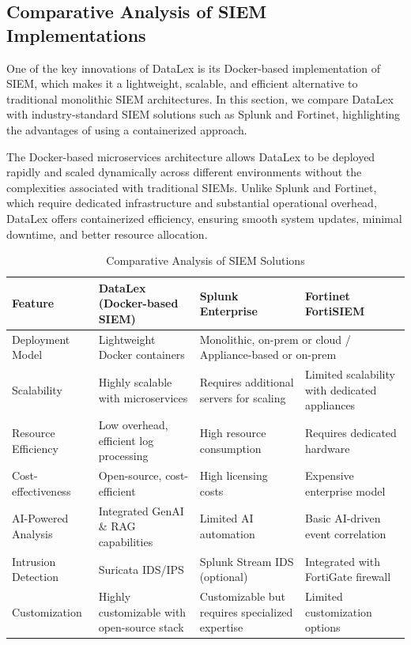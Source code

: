\subsection{Comparative Analysis of SIEM Implementations}
\label{subsec_comparative_siem_implementations}

One of the key innovations of DataLex is its Docker-based implementation of SIEM, which makes it a lightweight, scalable, and efficient alternative to traditional monolithic SIEM architectures. In this section, we compare DataLex with industry-standard SIEM solutions such as Splunk and Fortinet, highlighting the advantages of using a containerized approach.

The Docker-based microservices architecture allows DataLex to be deployed rapidly and scaled dynamically across different environments without the complexities associated with traditional SIEMs. Unlike Splunk and Fortinet, which require dedicated infrastructure and substantial operational overhead, DataLex offers containerized efficiency, ensuring smooth system updates, minimal downtime, and better resource allocation.

\begin{table}[h!]
\centering
\begin{tabular}{p{2.6cm}p{3cm}p{3cm}p{3.5cm}}
\hline
\textbf{Feature} & \textbf{DataLex (Docker-based SIEM)} & \textbf{Splunk Enterprise} & \textbf{Fortinet FortiSIEM} \\
\hline
Deployment Model & Lightweight Docker containers & \multicolumn{2}{l}{Monolithic, on-prem or cloud / Appliance-based or on-prem} \\
Scalability & Highly scalable with microservices & Requires additional servers for scaling & Limited scalability with dedicated appliances \\
Resource Efficiency & Low overhead, efficient log processing & High resource consumption & Requires dedicated hardware \\
Cost-effectiveness & Open-source, cost-efficient & High licensing costs & Expensive enterprise model \\
AI-Powered Analysis & Integrated GenAI \& RAG capabilities & Limited AI automation & Basic AI-driven event correlation \\
Intrusion Detection & Suricata IDS/IPS & Splunk Stream IDS (optional) & Integrated with FortiGate firewall \\
Customization & Highly customizable with open-source stack & Customizable but requires specialized expertise & Limited customization options \\
\hline
\end{tabular}
\caption{Comparative Analysis of SIEM Solutions}
\label{tab:siem-implementations-comparison}
\end{table}
